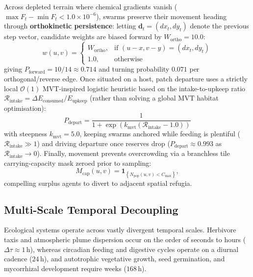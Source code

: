 Across depleted terrain where chemical gradients vanish ($\max F_t - \min F_t < 1.0 \times 10^{-6}$), swarms preserve their movement heading through \textbf{orthokinetic persistence}: letting $\mathbf{d}_t = (dx_t, dy_t)$ denote the previous step vector, candidate weights are biased forward by $W_{\text{ortho}} = 10.0$:
\begin{equation}
  w(u, v) = \begin{cases}
    W_{\text{ortho}}, & \text{if } (u - x, v - y) = (dx_t, dy_t) \\
    1.0, & \text{otherwise}
  \end{cases}
  \label{eq:orthokinetic_weight}
\end{equation}
giving $P_{\text{forward}} = 10/14 \approx 0.714$ and turning probability $0.071$ per orthogonal/reverse edge. Once situated on a host, patch departure uses a strictly local $\mathcal{O}(1)$ MVT-inspired logistic heuristic based on the intake-to-upkeep ratio $\mathcal{R}_{\text{intake}} = \Delta E_{\text{consumed}} / E_{\text{upkeep}}$ (rather than solving a global MVT habitat optimisation):
\begin{equation}
  P_{\text{depart}} = \frac{1}{1 + \exp\left( k_{\text{mvt}} \left( \mathcal{R}_{\text{intake}} - 1.0 \right) \right)}
  \label{eq:mvt_logistic_departure}
\end{equation}
with steepness $k_{\text{mvt}} = 5.0$, keeping swarms anchored while feeding is plentiful ($\mathcal{R}_{\text{intake}} \gg 1$) and driving departure once reserves drop ($P_{\text{depart}} \approx 0.993$ as $\mathcal{R}_{\text{intake}} \to 0$). Finally, movement prevents overcrowding via a branchless tile carrying-capacity mask zeroed prior to sampling:
\begin{equation}
  M_{\text{cap}}(u, v) = \mathbf{1}_{\left\{ N_{\text{pop}}(u, v) < C_{\max} \right\}},
  \label{eq:capacity_mask}
\end{equation}
compelling surplus agents to divert to adjacent spatial refugia.

\subsection{Multi-Scale Temporal Decoupling}
\label{subsec:temporal_decoupling}

Ecological systems operate across vastly divergent temporal scales. Herbivore taxis and atmospheric plume dispersion occur on the order of seconds to hours ($\Delta \tau \approx 1\,\text{h}$), whereas circadian feeding and digestive cycles operate on a diurnal cadence ($24\,\text{h}$), and autotrophic vegetative growth, seed germination, and mycorrhizal development require weeks ($168\,\text{h}$).

